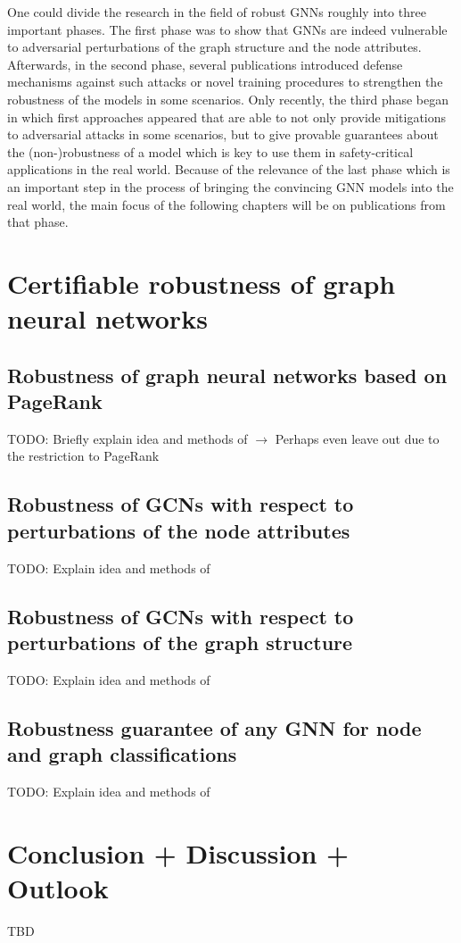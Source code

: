 \documentclass[a4paper,preprint]{sig-alternate}
\begin{document}
One could divide the research in the field of robust GNNs roughly into three important phases.
The first phase was to show that GNNs are indeed vulnerable to adversarial perturbations of the graph structure and the node attributes.
Afterwards, in the second phase, several publications introduced defense mechanisms against such attacks or novel training procedures 
to strengthen the robustness of the models in some scenarios. Only recently, the third phase began in which first approaches appeared
that are able to not only provide mitigations to adversarial attacks in some scenarios, but to give provable guarantees about the (non-)robustness 
of a model which is key to use them in safety-critical applications in the real world. Because of the relevance of the last phase which 
is an important step in the process of bringing the convincing GNN models into the real world, the main focus of the following chapters
will be on publications from that phase.

\section{Certifiable robustness of graph neural networks}
\label{sec:main_section}

\subsection{Robustness of graph neural networks based on PageRank}
\label{sec:paper_one}

TODO: Briefly explain idea and methods of \cite{bojchevski2019certifiable}\newline
$\rightarrow$ Perhaps even leave out due to the restriction to PageRank

\subsection{Robustness of GCNs with respect to perturbations of the node attributes}
\label{sec:paper_two}

TODO: Explain idea and methods of \cite{Z_gner_2019}

\subsection{Robustness of GCNs with respect to perturbations of the graph structure}
\label{sec:paper_three}

TODO: Explain idea and methods of \cite{10.1145/3394486.3403217}

\subsection{Robustness guarantee of any GNN for node and graph classifications}
\label{sec:paper_four}

TODO: Explain idea and methods of \cite{wang2020certified}

\section{Conclusion + Discussion + Outlook}
\label{sec:conclusion}
TBD

\pagebreak



\end{document}
